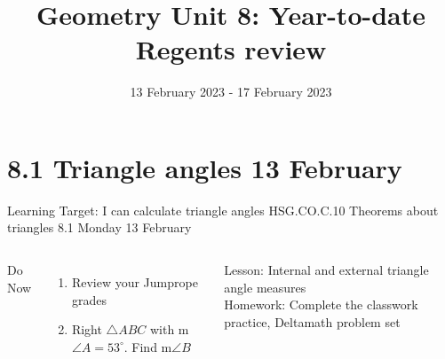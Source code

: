 

\newcommand\ticks{}
  \def\ticks{{Bar[scale=2]}-{Bar[scale=2]}}
\newcommand\paraticks{}
  \def\paraticks{{Straight Barb[reversed, scale=2]}-{Straight Barb[scale=2]}}

\title{Geometry Unit 8: Year-to-date Regents review}
\date{13 February 2023 - 17 February 2023}


\frame{\titlepage}
\section[Outline]{}
\frame{\tableofcontents}

\section{8.1 Triangle angles \hfill 13 February \,}
\begin{frame}{Learning Target: I can calculate triangle angles}
  {HSG.CO.C.10 Theorems about triangles \hfill \alert{8.1 Monday 13 February}}
  \begin{columns}
    Do Now
    \begin{enumerate}
      \item Review your Jumprope grades
      \item Right $\triangle ABC$ with m$\angle A = 53^\circ$. Find  m$\angle B$
    \end{enumerate}
    Lesson: Internal and external triangle angle measures \\
    Homework: Complete the classwork practice, Deltamath problem set
    \begin{flushright}
    \end{flushright}
  \end{columns}
\end{frame}

